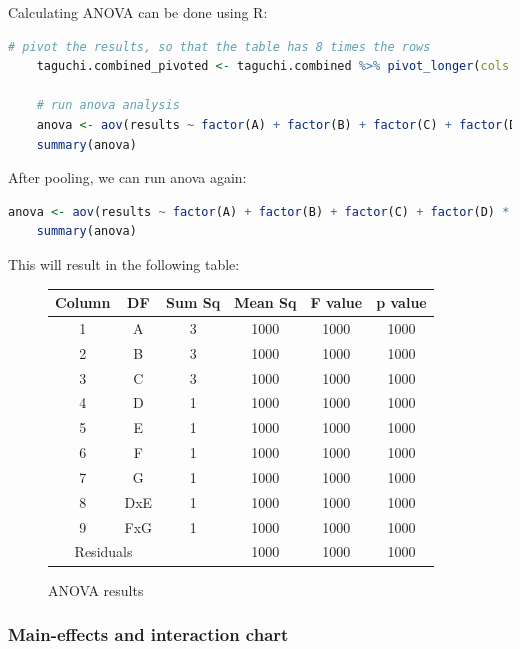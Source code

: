 Calculating ANOVA can be done using R: 
\begin{lstlisting}[language=R]
	# pivot the results, so that the table has 8 times the rows
	taguchi.combined_pivoted <- taguchi.combined %>% pivot_longer(cols = starts_with("min_"), values_to = "results")

	# run anova analysis
	anova <- aov(results ~ factor(A) + factor(B) + factor(C) + factor(D) * factor(E) + factor(F) * factor(G), data = taguchi.combined_pivoted)
	summary(anova)
\end{lstlisting}

After pooling, we can run anova again:
\begin{lstlisting}[language=R]
	anova <- aov(results ~ factor(A) + factor(B) + factor(C) + factor(D) * factor(E) + factor(F) * factor(G), data = taguchi.combined_pivoted)
	summary(anova)
\end{lstlisting}

This will result in the following table:

\begin{figure}[H]
	\centering
	\begin{tabular}{ |cccccc|  }
		\hline
		Column 		& DF & Sum Sq & Mean Sq & F value & p value\\
		\hline
		1  & A 		& 3 & 1000 & 1000 & 1000\\
		2  & B 		& 3 & 1000 & 1000 & 1000\\
		3  & C 		& 3 & 1000 & 1000 & 1000\\
		4  & D 		& 1 & 1000 & 1000 & 1000\\
		5  & E 		& 1 & 1000 & 1000 & 1000\\
		6  & F 		& 1 & 1000 & 1000 & 1000\\
		7  & G 		& 1 & 1000 & 1000 & 1000\\
		8  & DxE 	& 1 & 1000 & 1000 & 1000\\
		9  & FxG 	& 1 & 1000 & 1000 & 1000\\
		\hline
		\multicolumn{2}{|c}{Residuals} &  & 1000 & 1000 & 1000\\
		\hline
	\end{tabular}
	\caption{ANOVA results}
\end{figure}

\subsubsection{Main-effects and interaction chart}

